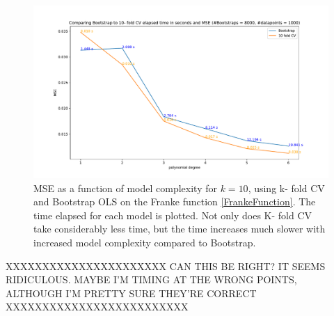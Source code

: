 \documentclass[11pt,a4paper,titlepage]{article}
\begin{document}
\begin{figure}[H]
\centering

\includegraphics[trim=2.0cm 0.9cm 2.7cm 1.2cm, clip=true,scale = 0.55]{KfoldVsBootstrap_k10_8kBootstraps_elapsedTime_comparison.pdf}
\caption[Comparing time elapsed from Bootstrap vs. K- fold CV]{MSE as a function of model complexity for $k=10$, using k- fold CV and Bootstrap OLS on the Franke function \eqref{FrankeFunction}. The time elapsed for each model is plotted. Not only does K- fold CV take considerably less time, but the time increases much slower with increased model complexity compared to Bootstrap.}\label{BootstrapVsKfold3}
\end{figure}
XXXXXXXXXXXXXXXXXXXXXX CAN THIS BE RIGHT? IT SEEMS RIDICULOUS. MAYBE I'M TIMING AT THE WRONG POINTS, ALTHOUGH I'M PRETTY SURE THEY'RE CORRECT XXXXXXXXXXXXXXXXXXXXXXXXX
\end{document}
